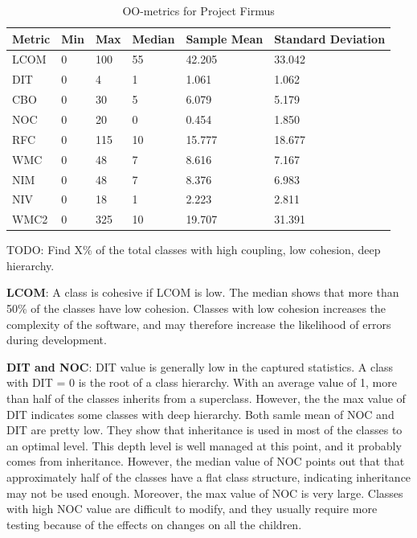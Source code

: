 \begin{table}[]
\centering
\caption{OO-metrics for Project Firmus}
\label{tab:oometrics-firmus}
\begin{tabular}{|l|l|l|l|l|l|}
\hline
\textbf{Metric} & \textbf{Min} & \textbf{Max} & \textbf{Median} & \textbf{Sample Mean} & \textbf{Standard Deviation} \\ \hline
LCOM            & 0            & 100          & 55              & 42.205               & 33.042                      \\ \hline
DIT             & 0            & 4            & 1               & 1.061                & 1.062                       \\ \hline
CBO             & 0            & 30           & 5               & 6.079                & 5.179                       \\ \hline
NOC             & 0            & 20           & 0               & 0.454                & 1.850                       \\ \hline
RFC             & 0            & 115          & 10              & 15.777               & 18.677                      \\ \hline
WMC             & 0            & 48           & 7               & 8.616                & 7.167                       \\ \hline
NIM             & 0            & 48           & 7               & 8.376                & 6.983                       \\ \hline
NIV             & 0            & 18           & 1               & 2.223                & 2.811                       \\ \hline
WMC2            & 0            & 325          & 10              & 19.707                 & 31.391                      \\ \hline
\end{tabular}
\end{table}

TODO: Find X\% of the total classes with high coupling, low cohesion, deep hierarchy. 

\textbf{LCOM}: A class is cohesive if LCOM is low. The median shows that more than 50\% of the classes have low cohesion. Classes with low cohesion increases the complexity of the software, and may therefore increase the likelihood of errors during development. 

\textbf{DIT and NOC}: DIT value is generally low in the captured statistics. A class with DIT = 0 is the root of a class hierarchy. With an average value of 1, more than half of the classes inherits from a superclass. However, the the max value of DIT indicates some classes with deep hierarchy. Both samle mean of NOC and DIT are pretty low. They show that inheritance is used in most of the classes to an optimal level. This depth level is well managed at this point, and it probably comes from inheritance. However, the median value of NOC points out that that approximately half of the classes have a flat class structure, indicating inheritance may not be used enough. Moreover, the max value of NOC is very large. Classes with high NOC value are difficult to modify, and they usually require more testing because of the effects on changes on all the children. 

